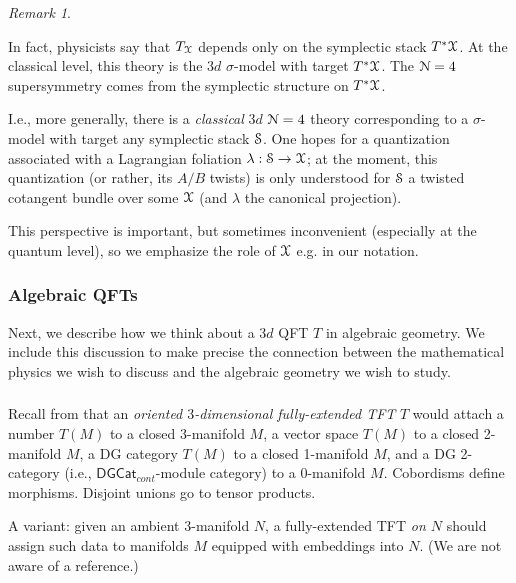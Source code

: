 \documentclass[reqno,11pt]{amsart}
\numberwithin{equation}{subsection}
\theoremstyle{remark}
\newtheorem{rem}[thm]{Remark}
\newcommand{\sN}{{\EuScript N}}
\newcommand{\sS}{{\EuScript S}}
\newcommand{\sX}{{\EuScript X}}
\newcommand{\DGCat}{\mathsf{DGCat}}
\begin{document}
\begin{rem}\label{r:3d-t*}

In fact, physicists
say that $T_{\sX}$ depends only on the symplectic stack 
$T^* \sX$. At the classical level, this theory
is the $3d$ $\sigma$-model with target $T^*\sX$. 
The $\sN = 4$ supersymmetry comes from the 
symplectic structure on $T^*\sX$. 

I.e., more generally, there is a \emph{classical} $3d$ $\sN = 4$ theory
corresponding to a $\sigma$-model with target any symplectic stack $\sS$. 
One hopes for a quantization associated with a Lagrangian
foliation $\lambda:\sS \to \sX$; 
at the moment, this quantization (or rather, its $A/B$ twists) 
is only understood for $\sS$ a twisted cotangent bundle over some $\sX$
(and $\lambda$ the canonical projection).

This perspective is important, but sometimes 
inconvenient (especially at the quantum level), 
so we emphasize the role of $\sX$ e.g. in our notation.

\end{rem}


\subsubsection{Algebraic QFTs}

Next, we describe how we think about a $3d$ QFT $T$ in algebraic geometry.
We include this discussion to make precise the connection between the mathematical
physics we wish to discuss and the algebraic geometry we wish to study.

\subsubsection{}

Recall from \cite{lurie-tft} that an \emph{oriented $3$-dimensional fully-extended TFT} 
$T$ would 
attach a number $T(M)$ to a closed 3-manifold $M$, a vector space
$T(M)$ to a closed 2-manifold $M$, a DG category $T(M)$ to a closed
1-manifold $M$, and a DG 2-category (i.e., $\DGCat_{cont}$-module
category) to a 0-manifold $M$. Cobordisms define morphisms. Disjoint unions
go to tensor products.

A variant: given an ambient $3$-manifold $N$, a fully-extended TFT \emph{on $N$} should
assign such data to manifolds $M$ equipped with embeddings into $N$.
(We are not aware of a reference.)
\end{document}
